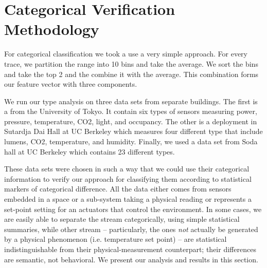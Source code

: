 \section{Categorical Verification Methodology}
For categorical classification we took a use a very simple approach.  For every trace, we partition the range into 10 bins
and take the average.  We sort the bins and take the top 2 and the combine it with the average.  This combination forms
our feature vector with three components.

We run our type analysis on three data sets from separate buildings.  The first is a from the University of Tokyo.  It contain 
six types of sensors measuring power, pressure, temperature, CO2, light, and occupancy.
The other is a deployment in Sutardja Dai Hall at UC Berkeley which measures four different type that include lumens, CO2, 
temperature, and humidity.
Finally, we used a data set from Soda hall at UC Berkeley which contains 23 different types.

These data sets were chosen in such a way that we could use their categorical information to verify our approach for classifying them
according to statistical markers of categorical difference.  All the data either comes from sensors embedded in a space or a sub-system taking
a physical reading or represents a set-point setting for an actuators that control the environment.
In some cases, we are easily able to separate the stream categorically, using simple statistical summaries, while other stream -- particularly,
the ones \emph{not} actually be generated by a physical phenomenon (i.e. temperature set point) -- are statistical indistinguishable
from their physical-measurement counterpart; their differences are semantic, not behavioral.  We present our analysis and results
in this section.

